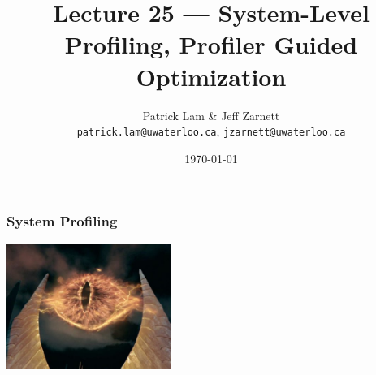 

\title{Lecture 25 --- System-Level Profiling, Profiler Guided Optimization }

\author{Patrick Lam \& Jeff Zarnett \\ \small \texttt{patrick.lam@uwaterloo.ca}, \texttt{jzarnett@uwaterloo.ca}}
\date{\today}




\begin{frame}
  \titlepage

 \end{frame}
 
 
\begin{frame}
\frametitle{System Profiling}

\begin{center}
	\includegraphics[width=0.4\textwidth]{images/Eye_of_sauron.jpg}
\end{center}

\end{frame}







